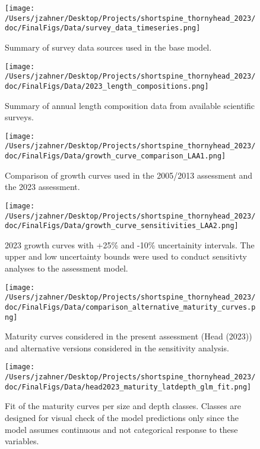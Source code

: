 \documentclass[11pt,
  english,
  letterpaper,
]{article}
\begin{document}
\begin{figure}
\centering
\texttt{[image: /Users/jzahner/Desktop/Projects/shortspine\_thornyhead\_2023/doc/FinalFigs/Data/survey\_data\_timeseries.png]}
\caption{Summary of survey data sources used in the base model.\label{fig:survey_data_timeseries}}
\end{figure}

\begin{figure}
\centering
\texttt{[image: /Users/jzahner/Desktop/Projects/shortspine\_thornyhead\_2023/doc/FinalFigs/Data/2023\_length\_compositions.png]}
\caption{Summary of annual length composition data from available scientific surveys.\label{fig:survey_comps}}
\end{figure}

\begin{figure}
\centering
\texttt{[image: /Users/jzahner/Desktop/Projects/shortspine\_thornyhead\_2023/doc/FinalFigs/Data/growth\_curve\_comparison\_LAA1.png]}
\caption{Comparison of growth curves used in the 2005/2013 assessment and the 2023 assessment.\label{fig:growth_LAA1}}
\end{figure}

\begin{figure}
\centering
\texttt{[image: /Users/jzahner/Desktop/Projects/shortspine\_thornyhead\_2023/doc/FinalFigs/Data/growth\_curve\_sensitivities\_LAA2.png]}
\caption{2023 growth curves with +25\% and -10\% uncertainity intervals. The upper and low uncertainty bounds were used to conduct sensitivty analyses to the assessment model.\label{fig:growth_LAA2}}
\end{figure}

\begin{figure}
\centering
\texttt{[image: /Users/jzahner/Desktop/Projects/shortspine\_thornyhead\_2023/doc/FinalFigs/Data/comparison\_alternative\_maturity\_curves.png]}
\caption{Maturity curves considered in the present assessment (Head (2023)) and alternative versions considered in the sensitivity analysis.\label{fig:mat2}}
\end{figure}

\begin{figure}
\centering
\texttt{[image: /Users/jzahner/Desktop/Projects/shortspine\_thornyhead\_2023/doc/FinalFigs/Data/head2023\_maturity\_latdepth\_glm\_fit.png]}
\caption{Fit of the maturity curves per size and depth classes. Classes are designed for visual check of the model predictions only since the model assumes continuous and not categorical response to these variables.\label{fig:mat1}}
\end{figure}
\end{document}
